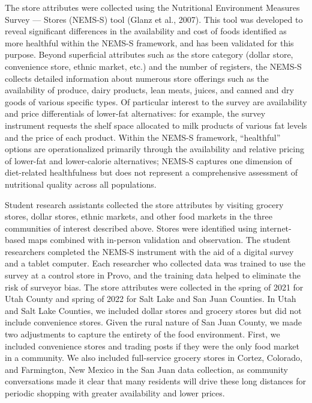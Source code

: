 \documentclass[
  letterpaper,
  number,
  review,
  3p]{elsarticle}
\begin{document}
The store attributes were collected using the Nutritional Environment
Measures Survey --- Stores (NEMS-S) tool (Glanz et al., 2007). This tool
was developed to reveal significant differences in the availability and
cost of foods identified as more healthful within the NEMS-S framework,
and has been validated for this purpose. Beyond superficial attributes
such as the store category (dollar store, convenience store, ethnic
market, etc.) and the number of registers, the NEMS-S collects detailed
information about numerous store offerings such as the availability of
produce, dairy products, lean meats, juices, and canned and dry goods of
various specific types. Of particular interest to the survey are
availability and price differentials of lower-fat alternatives: for
example, the survey instrument requests the shelf space allocated to
milk products of various fat levels and the price of each product.
Within the NEMS-S framework, ``healthful'' options are operationalized
primarily through the availability and relative pricing of lower-fat and
lower-calorie alternatives; NEMS-S captures one dimension of
diet-related healthfulness but does not represent a comprehensive
assessment of nutritional quality across all populations.

Student research assistants collected the store attributes by visiting
grocery stores, dollar stores, ethnic markets, and other food markets in
the three communities of interest described above. Stores were
identified using internet-based maps combined with in-person validation
and observation. The student researchers completed the NEMS-S instrument
with the aid of a digital survey and a tablet computer. Each researcher
who collected data was trained to use the survey at a control store in
Provo, and the training data helped to eliminate the risk of surveyor
bias. The store attributes were collected in the spring of 2021 for Utah
County and spring of 2022 for Salt Lake and San Juan Counties. In Utah
and Salt Lake Counties, we included dollar stores and grocery stores but
did not include convenience stores. Given the rural nature of San Juan
County, we made two adjustments to capture the entirety of the food
environment. First, we included convenience stores and trading posts if
they were the only food market in a community. We also included
full-service grocery stores in Cortez, Colorado, and Farmington, New
Mexico in the San Juan data collection, as community conversations made
it clear that many residents will drive these long distances for
periodic shopping with greater availability and lower prices.
\end{document}
